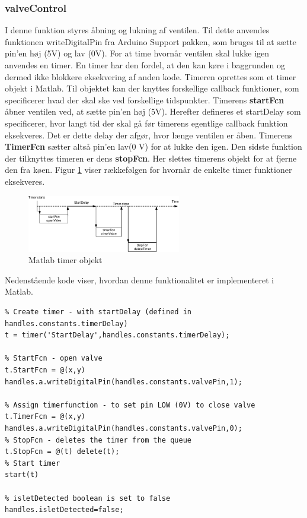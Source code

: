 \subsubsection{valveControl}
I denne funktion styres åbning og lukning af ventilen. Til dette anvendes funktionen writeDigitalPin fra Arduino Support pakken, som bruges til at sætte pin'en høj (5V) og lav (0V). For at time hvornår ventilen skal lukke igen anvendes en timer. En timer har den fordel, at den kan køre i baggrunden og dermed ikke blokkere eksekvering af anden kode. Timeren oprettes som et timer objekt i Matlab. Til objektet kan der knyttes forskellige callback funktioner, som specificerer hvad der skal ske ved forskellige tidspunkter. Timerens \textbf{startFcn} åbner ventilen ved, at sætte pin'en høj (5V). Herefter defineres et startDelay som specificerer, hvor langt tid der skal gå før timerens egentlige callback funktion eksekveres. Det er dette delay der afgør, hvor længe ventilen er åben. Timerens \textbf{TimerFcn} sætter altså pin'en lav(0 V) for at lukke den igen. Den sidste funktion der tilknyttes timeren er dens \textbf{stopFcn}. Her slettes timerens objekt for at fjerne den fra køen. Figur \ref{fig:timer} viser rækkefølgen for hvornår de enkelte timer funktioner eksekveres. 
\begin{figure}[H]
	\centering
	\includegraphics[width=0.6\textwidth]{billeder/software/timer-crop.pdf}
	\caption{Matlab timer objekt}
	\label{fig:timer}
\end{figure}
Nedenstående kode viser, hvordan denne funktionalitet er implementeret i Matlab.  
\begin{lstlisting} 
% Create timer - with startDelay (defined in handles.constants.timerDelay)
t = timer('StartDelay',handles.constants.timerDelay);

% StartFcn - open valve
t.StartFcn = @(x,y) handles.a.writeDigitalPin(handles.constants.valvePin,1);

% Assign timerfunction - to set pin LOW (0V) to close valve
t.TimerFcn = @(x,y) handles.a.writeDigitalPin(handles.constants.valvePin,0);
% StopFcn - deletes the timer from the queue 
t.StopFcn = @(t) delete(t);
% Start timer
start(t)

% isletDetected boolean is set to false
handles.isletDetected=false;
\end{lstlisting} 
\newpage
